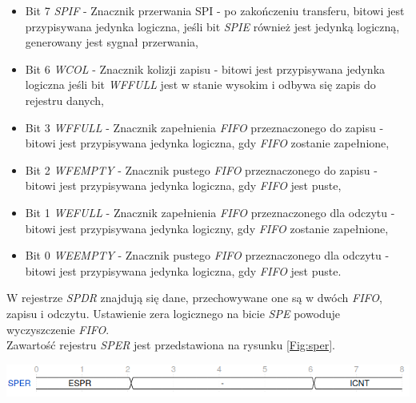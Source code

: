 \documentclass[11pt,a4paper]{article}
\begin{document}
			\begin{itemize}
				\item Bit 7 \textit{SPIF} - Znacznik przerwania SPI - po zakończeniu transferu, bitowi jest przypisywana jedynka logiczna, jeśli bit \textit{SPIE} również jest jedynką logiczną, generowany jest sygnał przerwania,
				\item Bit 6 \textit{WCOL} - Znacznik kolizji zapisu - bitowi jest przypisywana jedynka logiczna jeśli bit \textit{WFFULL} jest w stanie wysokim i odbywa się zapis do rejestru danych,
				\item Bit 3 \textit{WFFULL} - Znacznik zapełnienia \textit{FIFO} przeznaczonego do zapisu - bitowi jest przypisywana jedynka logiczna, gdy \textit{FIFO} zostanie zapełnione,
				\item Bit 2 \textit{WFEMPTY} - Znacznik pustego \textit{FIFO} przeznaczonego do zapisu - bitowi jest przypisywana jedynka logiczna, gdy \textit{FIFO} jest puste,
				\item Bit 1 \textit{WEFULL} - Znacznik zapełnienia \textit{FIFO} przeznaczonego dla odczytu - bitowi jest przypisywana jedynka logiczny, gdy \textit{FIFO} zostanie zapełnione,
				\item Bit 0 \textit{WEEMPTY} - Znacznik pustego \textit{FIFO} przeznaczonego dla odczytu - bitowi jest przypisywana jedynka logiczna, gdy \textit{FIFO} jest puste.
			\end{itemize}
W rejestrze \textit{SPDR} znajdują się dane, przechowywane one są w dwóch \textit{FIFO}, zapisu i odczytu. Ustawienie zera logicznego na bicie \textit{SPE} powoduje wyczyszczenie \textit{FIFO}. \\
Zawartość rejestru \textit{SPER} jest przedstawiona na rysunku \ref{Fig:sper}.\\
\begin{minipage}[c]{\textwidth}
					\includegraphics[width=\textwidth]{./rysunki/sper.png}
\end{minipage}
\end{document}
